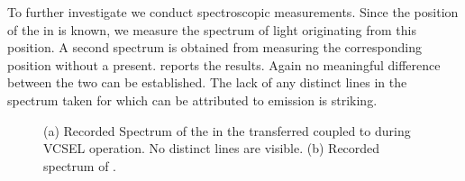 		To further investigate we conduct spectroscopic measurements. Since the position of the \nd in \BmFour is known, we measure the spectrum of light originating from this position. A second spectrum is obtained from \BmTwo measuring the corresponding position without a \nd present.  reports the results. Again no meaningful difference between the two \VCSELs can be established. The lack of any distinct lines in the spectrum taken for \BmFour{} which can be attributed to \siv emission is striking.

			\begin{figure}[htp]
				\begin{subfigure}[t]{ 0.49\linewidth}
					\centering
					\caption{}
					\label{subfig::spectrum_vcsel_excitation_with_diamond}
				\end{subfigure}
				\hfill
				\begin{subfigure}[t]{ 0.49\linewidth}
					\centering
					\caption{}
					\label{subfig::spectrum_vcsel_excitation_without_diamond}
				\end{subfigure}
				\caption[Comparison of spectra between \BmFour and \BmTwo]{(a) Recorded Spectrum of the \siv in the transferred \nd coupled to \BmFour during VCSEL operation. No distinct \siv lines are visible. (b) Recorded spectrum of \BmTwo.}
				\label{fig::vcsel_spectra}
			\end{figure}

